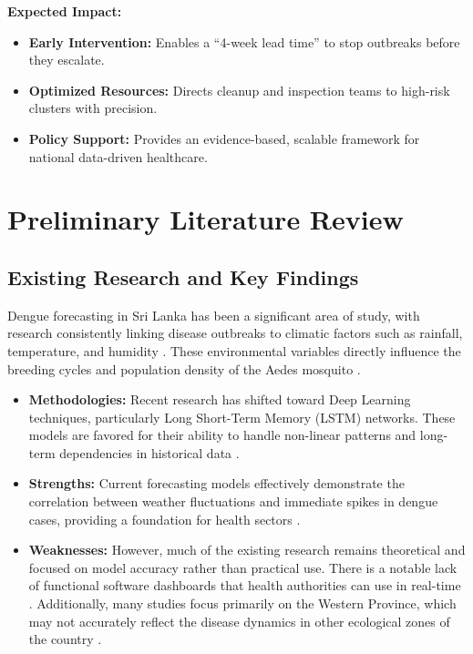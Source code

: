 ﻿\documentclass[12pt,a4paper]{article}
\begin{document}
\noindent\textbf{Expected Impact:}
\begin{itemize}
    \item \textbf{Early Intervention:} Enables a ``4-week lead time'' to stop outbreaks before they escalate.
    \item \textbf{Optimized Resources:} Directs cleanup and inspection teams to high-risk clusters with precision.
    \item \textbf{Policy Support:} Provides an evidence-based, scalable framework for national data-driven healthcare.
\end{itemize}

\section{Preliminary Literature Review}

\subsection{Existing Research and Key Findings}
Dengue forecasting in Sri Lanka has been a significant area of study, with research consistently linking disease outbreaks to climatic factors such as rainfall, temperature, and humidity \parencite{wickramathilaka2024}. These environmental variables directly influence the breeding cycles and population density of the Aedes mosquito \parencite{withanage2018}.

\begin{itemize}
    \item \textbf{Methodologies:} Recent research has shifted toward Deep Learning techniques, particularly Long Short-Term Memory (LSTM) networks. These models are favored for their ability to handle non-linear patterns and long-term dependencies in historical data \parencite{bannoud2026, uduwanage2025}.
    \item \textbf{Strengths:} Current forecasting models effectively demonstrate the correlation between weather fluctuations and immediate spikes in dengue cases, providing a foundation for health sectors \parencite{karasinghe2024}.
    \item \textbf{Weaknesses:} However, much of the existing research remains theoretical and focused on model accuracy rather than practical use. There is a notable lack of functional software dashboards that health authorities can use in real-time \parencite{wickramathilaka2024}. Additionally, many studies focus primarily on the Western Province, which may not accurately reflect the disease dynamics in other ecological zones of the country \parencite{fernando2024}.
\end{itemize}
\end{document}
